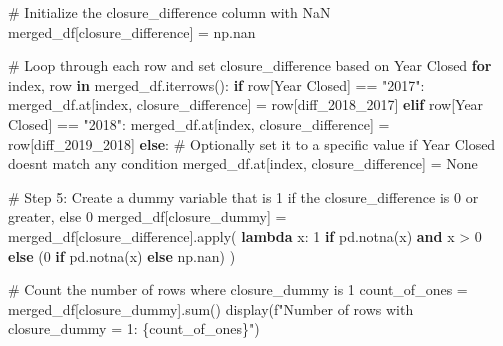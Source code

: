 \documentclass[
  letterpaper,
  DIV=11,
  numbers=noendperiod]{scrartcl}
\newenvironment{Shaded}{\begin{snugshade}}{\end{snugshade}}
\newcommand{\BuiltInTok}[1]{\textcolor[rgb]{0.00,0.23,0.31}{#1}}
\newcommand{\CommentTok}[1]{\textcolor[rgb]{0.37,0.37,0.37}{#1}}
\newcommand{\ControlFlowTok}[1]{\textcolor[rgb]{0.00,0.23,0.31}{\textbf{#1}}}
\newcommand{\DecValTok}[1]{\textcolor[rgb]{0.68,0.00,0.00}{#1}}
\newcommand{\KeywordTok}[1]{\textcolor[rgb]{0.00,0.23,0.31}{\textbf{#1}}}
\newcommand{\NormalTok}[1]{\textcolor[rgb]{0.00,0.23,0.31}{#1}}
\newcommand{\OperatorTok}[1]{\textcolor[rgb]{0.37,0.37,0.37}{#1}}
\newcommand{\SpecialCharTok}[1]{\textcolor[rgb]{0.37,0.37,0.37}{#1}}
\newcommand{\SpecialStringTok}[1]{\textcolor[rgb]{0.13,0.47,0.30}{#1}}
\newcommand{\StringTok}[1]{\textcolor[rgb]{0.13,0.47,0.30}{#1}}
\newcommand{\VariableTok}[1]{\textcolor[rgb]{0.07,0.07,0.07}{#1}}
\begin{document}
\begin{Shaded}
\begin{Highlighting}[]
\CommentTok{\# Initialize the closure\_difference column with NaN}
\NormalTok{merged\_df[}\StringTok{\textquotesingle{}closure\_difference\textquotesingle{}}\NormalTok{] }\OperatorTok{=}\NormalTok{ np.nan}

\CommentTok{\# Loop through each row and set closure\_difference based on Year Closed}
\ControlFlowTok{for}\NormalTok{ index, row }\KeywordTok{in}\NormalTok{ merged\_df.iterrows():}
    \ControlFlowTok{if}\NormalTok{ row[}\StringTok{\textquotesingle{}Year Closed\textquotesingle{}}\NormalTok{] }\OperatorTok{==} \StringTok{"2017"}\NormalTok{:}
\NormalTok{        merged\_df.at[index, }\StringTok{\textquotesingle{}closure\_difference\textquotesingle{}}\NormalTok{] }\OperatorTok{=}\NormalTok{ row[}\StringTok{\textquotesingle{}diff\_2018\_2017\textquotesingle{}}\NormalTok{]}
    \ControlFlowTok{elif}\NormalTok{ row[}\StringTok{\textquotesingle{}Year Closed\textquotesingle{}}\NormalTok{] }\OperatorTok{==} \StringTok{"2018"}\NormalTok{:}
\NormalTok{        merged\_df.at[index, }\StringTok{\textquotesingle{}closure\_difference\textquotesingle{}}\NormalTok{] }\OperatorTok{=}\NormalTok{ row[}\StringTok{\textquotesingle{}diff\_2019\_2018\textquotesingle{}}\NormalTok{]}
    \ControlFlowTok{else}\NormalTok{:}
        \CommentTok{\# Optionally set it to a specific value if Year Closed doesn\textquotesingle{}t match any condition}
\NormalTok{        merged\_df.at[index, }\StringTok{\textquotesingle{}closure\_difference\textquotesingle{}}\NormalTok{] }\OperatorTok{=} \VariableTok{None}

\CommentTok{\# Step 5: Create a dummy variable that is 1 if the closure\_difference is 0 or greater, else 0}
\NormalTok{merged\_df[}\StringTok{\textquotesingle{}closure\_dummy\textquotesingle{}}\NormalTok{] }\OperatorTok{=}\NormalTok{ merged\_df[}\StringTok{\textquotesingle{}closure\_difference\textquotesingle{}}\NormalTok{].}\BuiltInTok{apply}\NormalTok{(}
    \KeywordTok{lambda}\NormalTok{ x: }\DecValTok{1} \ControlFlowTok{if}\NormalTok{ pd.notna(x) }\KeywordTok{and}\NormalTok{ x }\OperatorTok{\textgreater{}} \DecValTok{0} \ControlFlowTok{else}\NormalTok{ (}\DecValTok{0} \ControlFlowTok{if}\NormalTok{ pd.notna(x) }\ControlFlowTok{else}\NormalTok{ np.nan)}
\NormalTok{)}

\CommentTok{\# Count the number of rows where closure\_dummy is 1}
\NormalTok{count\_of\_ones }\OperatorTok{=}\NormalTok{ merged\_df[}\StringTok{\textquotesingle{}closure\_dummy\textquotesingle{}}\NormalTok{].}\BuiltInTok{sum}\NormalTok{()}
\NormalTok{display(}\SpecialStringTok{f"Number of rows with closure\_dummy = 1: }\SpecialCharTok{\{}\NormalTok{count\_of\_ones}\SpecialCharTok{\}}\SpecialStringTok{"}\NormalTok{)}


\end{Highlighting}
\end{Shaded}
\end{document}
